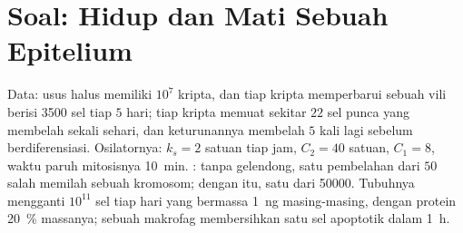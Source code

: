 \section{Soal: Hidup dan Mati Sebuah Epitelium}

\begin{problem}
\label{pb:b3:cell-cycle-apoptosis:1}
Data: usus halus memiliki $10^{7}$ kripta, dan tiap kripta memperbarui sebuah
vili berisi \num{3500} sel tiap $5$ hari; tiap kripta memuat sekitar $22$ sel
punca yang membelah sekali sehari, dan keturunannya membelah $5$ kali lagi
sebelum berdiferensiasi. Osilatornya: $k_{s} = 2$ satuan  tiap jam,
$C_{2} = 40$ satuan, $C_{1} = 8$, waktu paruh  mitosisnya
\qty{10}{min}. : tanpa  gelendong, satu pembelahan
dari $50$ salah memilah sebuah kromosom; dengan  itu, satu dari
\num{50000}. Tubuhnya mengganti $10^{11}$ sel tiap hari yang bermassa
\qty{1}{ng} masing-masing, dengan protein \qty{20}{\%} massanya; sebuah
makrofag membersihkan satu sel apoptotik dalam \qty{1}{h}.


\end{problem}
